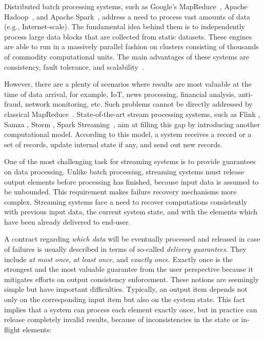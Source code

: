 
\label {fs-intro-seciton}

Distributed batch processing systems, such as Google's MapReduce~\cite{Dean:2008:MSD:1327452.1327492}, Apache Hadoop~\cite{hadoop2009hadoop}, and Apache Spark~\cite{Zaharia:2016:ASU:3013530.2934664}, address a need to process vast amounts of data (e.g., Internet-scale). The fundamental idea behind them is to independently process large data blocks that are collected from static datasets. These engines are able to run in a massively parallel fashion on clusters consisting of thousands of commodity computational units. The main advantages of these systems are consistency, fault tolerance, and scalability~\cite{borthakur2011apache}.

However, there are a plenty of scenarios where results are most valuable at the time of data arrival, for example, IoT, news processing, financial analysis, anti-fraud, network monitoring, etc. Such problems cannot be directly addressed by classical MapReduce~\cite{Doulkeridis:2014:SLA:2628707.2628782}. State-of-the-art stream processing systems, such as Flink \cite{carbone2015apache}, Samza \cite{Noghabi:2017:SSS:3137765.3137770}, Storm \cite{apache:storm}, Spark Streaming~\cite{Zaharia:2012:DSE:2342763.2342773}, aim at filling this gap by introducing another computational model. According to this model, a system receives a record or a set of records, update internal state if any, and send out new records. 

One of the most challenging task for streaming systems is to provide guarantees on data processing. Unlike batch processing, streaming systems must release output elements before processing has finished, because input data is assumed to be unbounded. This requirement makes failure recovery mechanisms more complex. Streaming systems face a need to recover computations consistently with previous input data, the current system state, and with the elements which have been already delivered to end-user. 

A contract regarding {\em which data} will be eventually processed and released in case of failures is usually described in terms of so-called {\em delivery guarantees}. They include {\em at most once}, {\em at least once}, and {\em exactly once}. Exactly once is the strongest and the most valuable guarantee from the user perspective because it mitigates efforts on output consistency enforcement. These notions are seemingly simple but have important difficulties. Typically, an output item depends not only on the corresponding input item but also on the system state. This fact implies that a system can process each element exactly once, but in practice can release completely invalid results, because of inconsistencies in the state or in-flight elements:

